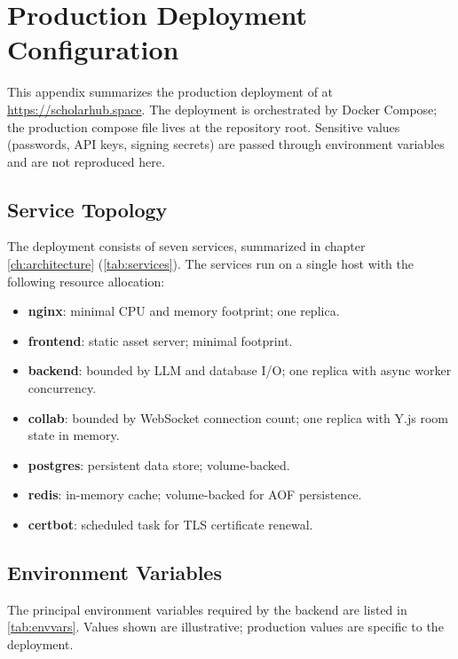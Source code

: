 \chapter{Production Deployment Configuration}
\label{app:deployment}

This appendix summarizes the production deployment of \sh{} at \url{https://scholarhub.space}. The deployment is orchestrated by Docker Compose; the production compose file lives at the repository root. Sensitive values (passwords, API keys, signing secrets) are passed through environment variables and are not reproduced here.

\section{Service Topology}

The deployment consists of seven services, summarized in chapter \ref{ch:architecture} (\cref{tab:services}). The services run on a single host with the following resource allocation:

\begin{itemize}
    \item \textbf{nginx}: minimal CPU and memory footprint; one replica.
    \item \textbf{frontend}: static asset server; minimal footprint.
    \item \textbf{backend}: bounded by LLM and database I/O; one replica with async worker concurrency.
    \item \textbf{collab}: bounded by WebSocket connection count; one replica with Y.js room state in memory.
    \item \textbf{postgres}: persistent data store; volume-backed.
    \item \textbf{redis}: in-memory cache; volume-backed for AOF persistence.
    \item \textbf{certbot}: scheduled task for TLS certificate renewal.
\end{itemize}

\section{Environment Variables}

The principal environment variables required by the backend are listed in \cref{tab:envvars}. Values shown are illustrative; production values are specific to the deployment.

